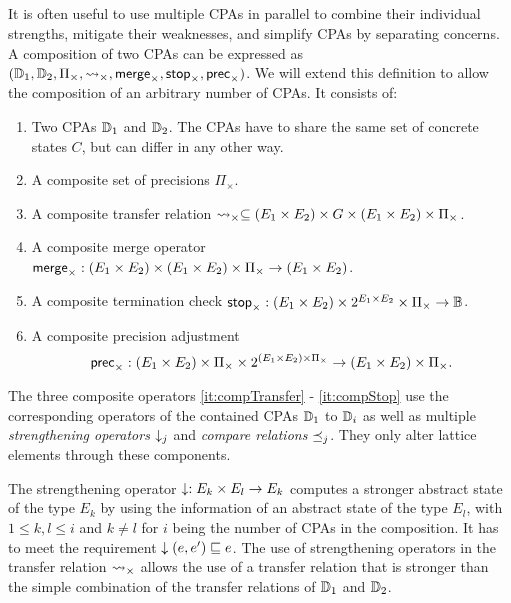 \subsection{\CompositeCPA}
It is often useful to use multiple CPAs in parallel to combine their individual strengths, mitigate their weaknesses, and simplify CPAs by separating concerns.
A composition of two CPAs \cite{Beyer2008} can be expressed as $(\mathbb{D}_1, \mathbb{D}_2, \Pi_\times, \rightsquigarrow_\times, \operatorname{\operatorname{\mathsf{merge}}}_\times, \operatorname{\operatorname{\mathsf{stop}}}_\times, \operatorname{\operatorname{\mathsf{prec}}}_\times)$.
We will extend this definition to allow the composition of an arbitrary number of CPAs.
It consists of:
\begin{enumerate}[leftmargin=*, label=\arabic*.]

\item Two CPAs $\mathbb{D}_1$ and $\mathbb{D}_2$. The CPAs have to share the same set of concrete states $C$, but can differ in any other way.
\item A composite set of precisions $\Pi_\times$.
\item \label{it:compTransfer} A composite transfer relation $\rightsquigarrow_\times \subseteq (E_1 \times E_2) \times G \times (E_1 \times E_2) \times \Pi_\times$.
\item \label{it:compMerge} A composite merge operator $\operatorname{\operatorname{\mathsf{merge}}}_\times : (E_1 \times E_2) \times (E_1 \times E_2) \times \Pi_\times \rightarrow (E_1 \times E_2)$.
\item \label{it:compStop} A composite termination check $\operatorname{\operatorname{\mathsf{stop}}}_\times : (E_1 \times E_2) \times 2^{E_1 \times E_2} \times \Pi_\times \rightarrow \mathbb{B}$.
\item A composite precision adjustment \[\operatorname{\operatorname{\mathsf{prec}}}_\times : (E_1 \times E_2) \times \Pi_\times \times 2^{(E_1 \times E_2) \times \Pi_\times} \rightarrow (E_1 \times E_2) \times \Pi_\times.\]
\end{enumerate}
The three composite operators \ref{it:compTransfer} - \ref{it:compStop} use the corresponding operators of the contained CPAs $\mathbb{D}_1$ to $\mathbb{D}_i$ as well as multiple \emph{strengthening operators} $\downarrow_j$ and \emph{compare relations} $\preceq_j$. They only alter lattice elements through these components.

The strengthening operator $\downarrow : E_k \times E_l \rightarrow E_k$ computes a stronger abstract state of the type $E_k$ by using the information of an abstract state of the type $E_l$,
with $1 \leq k,l \leq i$ and $k \neq l$ for $i$ being the number of CPAs in the composition.
It has to meet the requirement $\downarrow(e, e') \sqsubseteq e$.
The use of strengthening operators in the transfer relation $\rightsquigarrow_\times$ allows the use of a transfer relation that is stronger than the simple combination of the transfer relations of $\mathbb{D}_1$ and $\mathbb{D}_2$.

